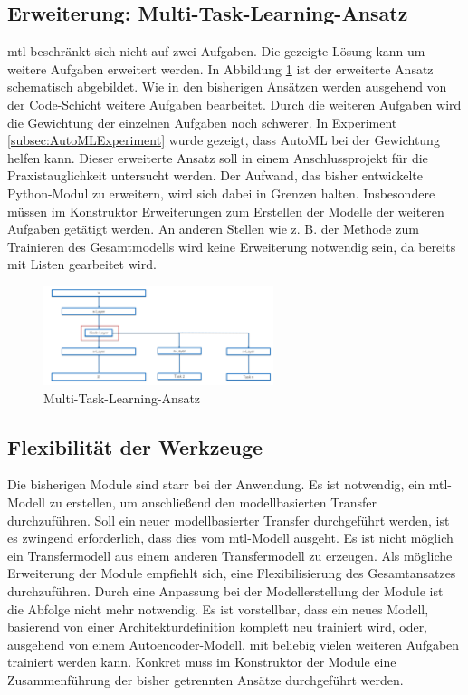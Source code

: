 	\subsection{Erweiterung: Multi-Task-Learning-Ansatz}
	\label{subsec:MehrfacheAufgaben}
	\acl{mtl} beschränkt sich nicht auf zwei Aufgaben. Die gezeigte Lösung kann um weitere Aufgaben erweitert werden. In Abbildung \ref{img:AusblickMultiTaskAnsatz} ist der erweiterte Ansatz schematisch abgebildet. Wie in den bisherigen Ansätzen werden ausgehend von der Code-Schicht weitere Aufgaben bearbeitet. Durch die weiteren Aufgaben wird die Gewichtung der einzelnen Aufgaben noch schwerer. In Experiment \ref{subsec:AutoMLExperiment}  wurde gezeigt, dass AutoML bei der Gewichtung helfen kann. Dieser erweiterte Ansatz soll in einem Anschlussprojekt für die Praxistauglichkeit untersucht werden. Der Aufwand, das bisher entwickelte Python-Modul zu erweitern, wird sich dabei in Grenzen halten. Insbesondere müssen im Konstruktor Erweiterungen zum Erstellen der Modelle der weiteren Aufgaben getätigt werden. An anderen Stellen wie z. B. der Methode zum Trainieren des Gesamtmodells wird keine Erweiterung notwendig sein, da bereits mit Listen gearbeitet wird.
	\begin{figure}[h]
		\centering
		\includegraphics[width=0.6\textwidth, center]{bilder/FazitUndAusblick/MultiTaskAnsatz.PNG}
		\caption{Multi-Task-Learning-Ansatz}
		\label{img:AusblickMultiTaskAnsatz}
	\end{figure}

	\subsection{Flexibilität der Werkzeuge}
	\label{subsec:FlexibilitätDerWerkzeuge}
	Die bisherigen Module sind starr bei der Anwendung. Es ist notwendig, ein \acl{mtl}-Modell zu erstellen, um anschließend den modellbasierten Transfer durchzuführen. Soll ein neuer modellbasierter Transfer durchgeführt werden, ist es zwingend erforderlich, dass dies vom \acl{mtl}-Modell ausgeht. Es ist nicht möglich ein Transfermodell aus einem anderen Transfermodell zu erzeugen. Als mögliche Erweiterung der Module empfiehlt sich, eine Flexibilisierung des Gesamtansatzes durchzuführen. Durch eine Anpassung bei der Modellerstellung der Module ist die Abfolge nicht mehr notwendig. Es ist vorstellbar, dass ein neues Modell, basierend von einer Architekturdefinition komplett neu trainiert wird, oder, ausgehend von einem Autoencoder-Modell, mit beliebig vielen weiteren Aufgaben trainiert werden kann. Konkret muss im Konstruktor der Module eine Zusammenführung der bisher getrennten Ansätze durchgeführt werden.     


	   